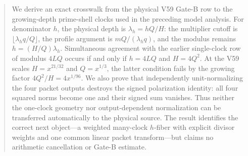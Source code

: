\begin{abstract}
We derive an exact crosswalk from the physical V59 Gate-B row to the growing-depth
prime-shell clocks used in the preceding model analysis.  For denominator $h$, the
physical depth is $\lambda_h=hQ/H$: the multiplier cutoff is
$\lfloor\lambda_hq/Q\rfloor$, the profile argument is
$mQ/(\lambda_hq)$, and the modulus remains $h=(H/Q)\lambda_h$.  Simultaneous
agreement with the earlier single-clock row of modulus $4LQ$ occurs if and only if
$h=4LQ$ and $H=4Q^2$.  At the V59 scales
$H=x^{21/32}$ and $Q=x^{1/3}$, the latter condition fails by the growing factor
$4Q^2/H=4x^{1/96}$.  We also prove that independently unit-normalizing the four
packet outputs destroys the signed polarization identity: all four squared norms
become one and their signed sum vanishes.  Thus neither the one-clock geometry nor
output-dependent normalization can be transferred automatically to the physical
source.  The result identifies the correct next object---a weighted many-clock
$h$-fiber with explicit divisor weights and one common linear packet transform---but
claims no arithmetic cancellation or Gate-B estimate.
\end{abstract}
